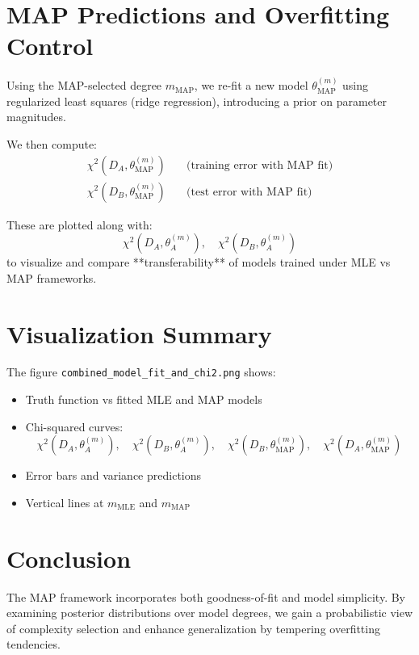 \documentclass[11pt]{article}
\begin{document}
\section*{MAP Predictions and Overfitting Control}

Using the MAP-selected degree \( m_{\text{MAP}} \), we re-fit a new model \( \theta_{\text{MAP}}^{(m)} \) using regularized least squares (ridge regression), introducing a prior on parameter magnitudes.

We then compute:
\begin{align*}
\chi^2(D_A, \theta_{\text{MAP}}^{(m)}) & \quad \text{(training error with MAP fit)} \\
\chi^2(D_B, \theta_{\text{MAP}}^{(m)}) & \quad \text{(test error with MAP fit)}
\end{align*}

These are plotted along with:
\[
\chi^2(D_A, \theta_A^{(m)}), \quad \chi^2(D_B, \theta_A^{(m)})
\]
to visualize and compare **transferability** of models trained under MLE vs MAP frameworks.

\section*{Visualization Summary}

The figure \texttt{combined\_model\_fit\_and\_chi2.png} shows:
\begin{itemize}
    \item Truth function vs fitted MLE and MAP models
    \item Chi-squared curves:
    \[
    \chi^2(D_A, \theta_A^{(m)}), \quad \chi^2(D_B, \theta_A^{(m)}), \quad \chi^2(D_B, \theta_{\text{MAP}}^{(m)}), \quad \chi^2(D_A, \theta_{\text{MAP}}^{(m)})
    \]
    \item Error bars and variance predictions
    \item Vertical lines at \( m_{\text{MLE}} \) and \( m_{\text{MAP}} \)
\end{itemize}

\section*{Conclusion}

The MAP framework incorporates both goodness-of-fit and model simplicity. By examining posterior distributions over model degrees, we gain a probabilistic view of complexity selection and enhance generalization by tempering overfitting tendencies.
\end{document}
